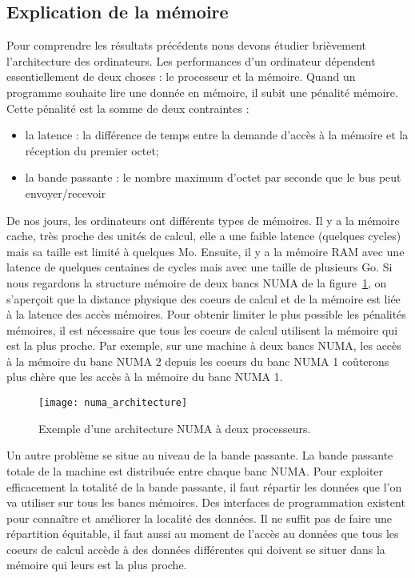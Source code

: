 \subsection{Explication de la mémoire}
Pour comprendre les résultats précédents nous devons étudier brièvement l'architecture des ordinateurs.
%
Les performances d'un ordinateur dépendent essentiellement de deux choses : le processeur et la mémoire.
%
Quand un programme souhaite lire une donnée en mémoire, il subit une pénalité mémoire.
%
Cette pénalité est la somme de deux contraintes :
\begin{itemize}
        \item la latence : la différence de temps entre la demande d'accès à la mémoire et la réception du premier octet;
        \item la bande passante : le nombre maximum d'octet par seconde que le bus peut envoyer/recevoir
\end{itemize}
%
De nos jours, les ordinateurs ont différents types de mémoires.
%
Il y a la mémoire cache, très proche des unités de calcul, elle a une faible latence (quelques cycles) mais sa taille est limité à quelques Mo.
%
Ensuite, il y a la mémoire RAM avec une latence de quelques centaines de cycles mais avec une taille de plusieurs Go.
%
Si nous regardons la structure mémoire de deux bancs NUMA de la figure~\ref{fig:numa_architecture}, on s'aperçoit que la distance physique des coeurs de calcul et de la mémoire est liée à la latence des accès mémoires.
%
Pour obtenir limiter le plus possible les pénalités mémoires, il est nécessaire que tous les coeurs de calcul utilisent la mémoire qui est la plus proche.
%
Par exemple, sur une machine à deux bancs NUMA, les accès à la mémoire du banc NUMA 2 depuis les coeurs du banc NUMA 1 coûterons plus chère que les accès à la mémoire du banc NUMA 1.

\begin{figure}[t!]
  \centering
  \texttt{[image: numa\_architecture]}
  \caption{Exemple d'une architecture NUMA à deux processeurs.}
  \label{fig:numa_architecture}
\end{figure}

Un autre problème se situe au niveau de la bande passante.
%
La bande passante totale de la machine est distribuée entre chaque banc NUMA.
%
Pour exploiter efficacement la totalité de la bande passante, il faut répartir les données que l'on va utiliser sur tous les bancs mémoires.
%
Des interfaces de programmation existent pour connaître et améliorer la localité des données.
%
Il ne suffit pas de faire une répartition équitable, il faut aussi au moment de l'accès au données que tous les coeurs de calcul accède à des données différentes qui doivent se situer dans la mémoire qui leurs est la plus proche.
